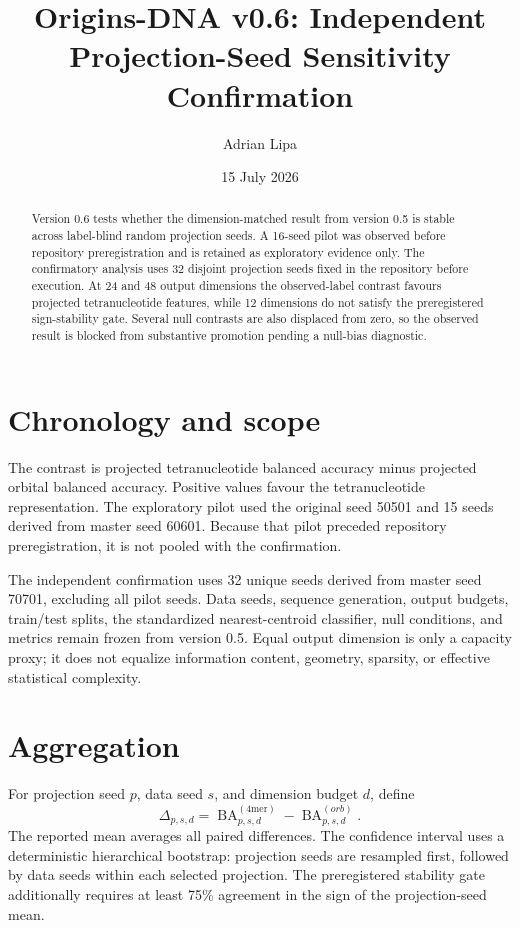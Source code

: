 \documentclass[11pt]{article}
\title{Origins-DNA v0.6: Independent Projection-Seed Sensitivity Confirmation}
\author{Adrian Lipa}
\date{15 July 2026}
\begin{document}
\maketitle

\begin{abstract}
Version 0.6 tests whether the dimension-matched result from version 0.5 is stable across label-blind random projection seeds. A 16-seed pilot was observed before repository preregistration and is retained as exploratory evidence only. The confirmatory analysis uses 32 disjoint projection seeds fixed in the repository before execution. At 24 and 48 output dimensions the observed-label contrast favours projected tetranucleotide features, while 12 dimensions do not satisfy the preregistered sign-stability gate. Several null contrasts are also displaced from zero, so the observed result is blocked from substantive promotion pending a null-bias diagnostic.
\end{abstract}

\section{Chronology and scope}
The contrast is projected tetranucleotide balanced accuracy minus projected orbital balanced accuracy. Positive values favour the tetranucleotide representation. The exploratory pilot used the original seed 50501 and 15 seeds derived from master seed 60601. Because that pilot preceded repository preregistration, it is not pooled with the confirmation.

The independent confirmation uses 32 unique seeds derived from master seed 70701, excluding all pilot seeds. Data seeds, sequence generation, output budgets, train/test splits, the standardized nearest-centroid classifier, null conditions, and metrics remain frozen from version 0.5. Equal output dimension is only a capacity proxy; it does not equalize information content, geometry, sparsity, or effective statistical complexity.

\section{Aggregation}
For projection seed $p$, data seed $s$, and dimension budget $d$, define
\begin{equation}
  \Delta_{p,s,d}=\operatorname{BA}^{(4\mathrm{mer})}_{p,s,d}-\operatorname{BA}^{(orb)}_{p,s,d}.
\end{equation}
The reported mean averages all paired differences. The confidence interval uses a deterministic hierarchical bootstrap: projection seeds are resampled first, followed by data seeds within each selected projection. The preregistered stability gate additionally requires at least 75\% agreement in the sign of the projection-seed mean.
\end{document}
